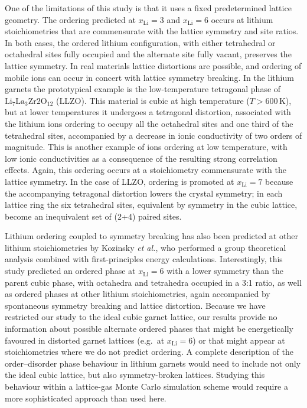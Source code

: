\documentclass[aps,prb,twocolumn,superscriptaddress,reprint]{revtex4-1}
\newcommand{\xLi}{x_\m{Li}}
\renewcommand{\u}[1]{\,\mathrm{#1}}
\newcommand{\m}[1]{\mathrm{#1}}
\newcommand{\chem}[1]{\ensuremath{\mathrm{#1}}}
\begin{document}
One of the limitations of this study is that it uses a fixed predetermined lattice geometry. The ordering predicted at $\xLi=3$ and $\xLi=6$ occurs at  lithium stoichiometries that are commensurate with the lattice symmetry and site ratios. In both cases, the ordered lithium configuration, with either tetrahedral or octahedral sites fully occupied and the alternate site fully vacant, preserves the lattice symmetry. In real materials lattice distortions are possible, and ordering of mobile ions can occur in concert with lattice symmetry breaking. In the lithium garnets the prototypical example is the low-temperature tetragonal phase of \chem{Li_7La_3Zr2O_{12}} (LLZO).\cite{BernsteinEtAl_PhysRevLett2012,AwakaEtAl_ChemLett2011} This material is cubic at high temperature ($T>600\u{K}$), but at lower temperatures it undergoes a tetragonal distortion, associated with the lithium ions ordering to occupy all the octahedral sites and one third of the tetrahedral sites, accompanied by a decrease in ionic conductivity of two orders of magnitude. This is another example of ions ordering at low temperature, with low ionic conductivities as a consequence of the resulting strong correlation effects.\cite{BurbanoEtAl_PhysRevLett2016} Again, this ordering occurs at a stoichiometry  commensurate with the lattice symmetry. In the case of LLZO, ordering is promoted at $\xLi=7$ because the accompanying tetragonal distortion lowers the crystal symmetry; in each lattice ring the six tetrahedral sites, equivalent by symmetry in the cubic lattice, become an inequivalent set of (2+4) paired sites. 

Lithium ordering coupled to symmetry breaking has also been predicted at other lithium stoichiometries by Kozinsky \emph{et al.},\cite{KozinskyEtAl_PhysRevLett2016} who performed a group theoretical analysis combined with first-principles energy calculations. Interestingly, this study predicted an ordered phase at $\xLi=6$ with a lower symmetry than the parent cubic phase, with octahedra and tetrahedra occupied in a 3:1 ratio, as well as ordered phases at other lithium stoichiometries, again accompanied by spontaneous symmetry breaking and lattice distortion. Because we have restricted our study to the ideal cubic garnet lattice, our results provide no information about possible alternate ordered phases that might be  energetically favoured in distorted garnet lattices (e.g.\ at $\xLi=6$) or that might appear at stoichiometries where we do not predict ordering. A complete description of the order--disorder phase behaviour in lithium garnets would need to include not only the ideal cubic lattice, but also symmetry-broken lattices. Studying this behaviour within a lattice-gas Monte Carlo simulation scheme would require a more sophisticated approach than used here.
\end{document}

